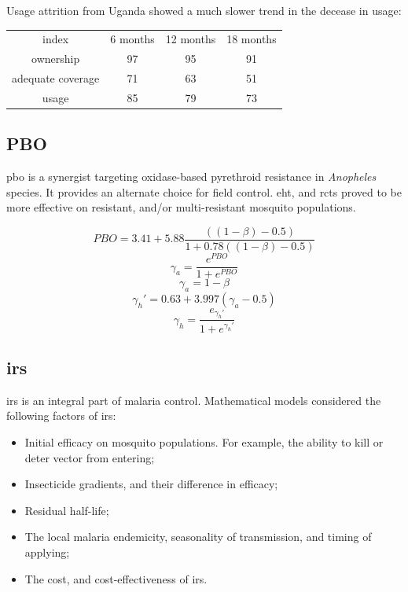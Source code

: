 \documentclass[a4paper, 12pt, twoside]{article}
\begin{document}
Usage attrition from Uganda\cite{Staedke2020} showed a much slower trend in the decease in usage:

\begin{center}
	\begin{tabular}{c c c c}
		index             & 6 months & 12 months & 18 months \\
		ownership         & 97       & 95        & 91        \\
		adequate coverage & 71       & 63        & 51        \\
		usage             & 85       & 79        & 73
	\end{tabular}
\end{center}


\subsection{PBO}
\gls{pbo} is a synergist targeting oxidase-based pyrethroid resistance in \textit{Anopheles} species.
It provides an alternate choice for field control.
\gls{eht}\cite{Akoton2018a}, and \gls{rct}s proved to be more effective on resistant, and/or multi-resistant mosquito populations.

\begin{equation}
  	PBO = 3.41 + 5.88 \frac{((1-\beta) - 0.5)}{1 + 0.78 ((1-\beta) - 0.5)}
\end{equation}
\begin{equation}
  	\gamma_a = \frac{e^{PBO}}{1 + e^{PBO}}
\end{equation}
\begin{equation}
  	\gamma_a = 1 - \beta
\end{equation}
\begin{equation}
	\gamma_h' = 0.63 + 3.997 ( \gamma_a - 0.5 )
\end{equation}
\begin{equation}
  	\gamma_h = \frac{e_{\gamma_h'}}{1+e^{\gamma_h'}}
\end{equation}

\subsection{\texorpdfstring{\gls{irs}}{IRS}}
\gls{irs} is an integral part of malaria control.
Mathematical models considered the following factors of \gls{irs}:

\begin{itemize}
  \item Initial efficacy on mosquito populations. For example, the ability to kill or deter vector from entering;
  \item Insecticide gradients, and their difference in efficacy;
  \item Residual half-life;
  \item The local malaria endemicity, seasonality of transmission, and timing of applying;
  \item The cost, and cost-effectiveness of \gls{irs}.
\end{itemize}
\end{document}

